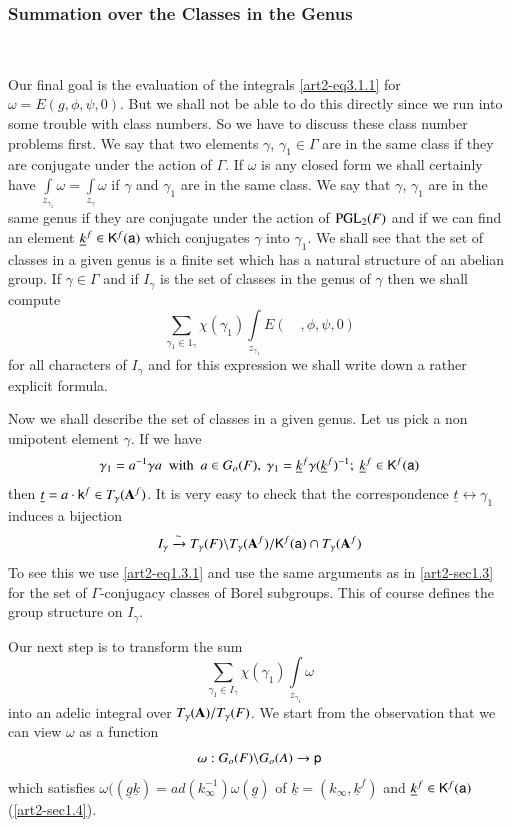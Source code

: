 \setcounter{subsubsection}{1}
\subsubsection{Summation over the Classes in the Genus}\label{art2-sec3.1.2}\pageoriginale
~

Our final goal is the evaluation of the integrals \eqref{art2-eq3.1.1} for $\omega=E(g,\phi,\psi,0)$. But we shall not be able to do this directly since we run into some trouble with class numbers. So we have to discuss these class number problems first. We say that two elements $\gamma$, $\gamma_{1}\in \Gamma$ are in the same class if they are conjugate under the action of $\Gamma$. If $\omega$ is any closed form we shall certainly have $\int\limits_{z_{\gamma_{1}}}\omega=\int\limits_{z_{\gamma}}\omega$ if $\gamma$ and $\gamma_{1}$ are in the same class. We say that $\gamma$, $\gamma_{1}$ are in the same genus if they are conjugate under the action of $\mathrm{PGL}_{2}(F)$ and if we can find an element $\underline{k}^{f}\in \mathsf{K}^{f}(\mathsf{a})$ which conjugates $\gamma$ into $\gamma_{1}$. We shall see that the set of classes in a given genus is a finite set which has a natural structure of an abelian group. If $\gamma\in \Gamma$ and if $I_{\gamma}$ is the set of classes in the genus of $\gamma$ then we shall compute
$$
\sum\limits_{\gamma_{1}\in 1_{\gamma}}\chi(\gamma_{1})\int\limits_{z_{\gamma_{1}}}E(\quad,\phi,\psi,0)
$$
for all characters of $I_{\gamma}$ and for this expression we shall write down a rather explicit formula.

Now we shall describe the set of classes in a given genus. Let us pick a non unipotent element $\gamma$. If we have
$$
\gamma_{1}=a^{-1}\gamma a\text{~ with~ } a\in G_{o}(F), \ \gamma_{1}=\underline{k}^{f}\gamma(\underline{k}^{f})^{-1}; \ \underline{k}^{f}\in \sfK^{f}(\sfa)
$$
then $\underline{t}=a\cdot \mathsf{k}^{f}\in T_{\gamma}(\mathbf{A}^{f})$. It is very easy to check that the correspondence $\underline{t}\leftrightarrow \gamma_{1}$ induces a bijection
$$
I_{\gamma}\xrightarrow{\sim}T_{\gamma}(F)\backslash T_{\gamma}(\mathbf{A}^{f})/\mathsf{K}^{f}(\mathsf{a})\cap T_{\gamma}(\mathbf{A}^{f})
$$
To see this we use \eqref{art2-eq1.3.1} and use the same arguments as in \ref{art2-sec1.3} for the set of $\Gamma$-conjugacy classes of Borel subgroups. This of course defines the group structure on $I_{\gamma}$.

Our next step is to transform the sum
$$
\sum\limits_{\gamma_{1}\in I_{\gamma}}\chi(\gamma_{1})\int\limits_{z_{\gamma_{1}}}\omega
$$
into an adelic integral over $T_{\gamma}(\mathbf{A})/T_{\gamma}(F)$. We start from the observation that we can view $\omega$ as a function
$$
\omega:G_{o}(F)\backslash G_{o}(A)\to \mathsf{p}
$$
which satisfies $\omega((\underline{g}\underline{k})=ad(k^{-1}_{\infty})\omega(\underline{g})$ of $\underline{k}=(k_{\infty},\underline{k}^{f})$ and $\underline{k}^{f}\in \mathsf{K}^{f}(\mathsf{a})$ (\ref{art2-sec1.4}).

